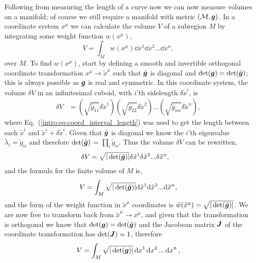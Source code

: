 Following from measuring the length of a curve now we can now measure volumes on a manifold; of course we still require a manifold with metric $(\mathcal{M},\boldsymbol{g})$. In a coordinate system $x^\mu$ we can calculate the volume $V$ of a subregion $M$ by integrating some weight function $w(x^\mu)$,
\begin{equation}
V = \int_{M} w(x^\mu) \dd x^1 \dd x^2 ... \dd x^n,
\end{equation}
over $M$. To find $w(x^\mu)$, start by defining a smooth and invertible orthogonal coordinate transformation $x^\mu \rightarrow \tilde{x}^\mu$ such that $\tilde{\boldsymbol{g}}$ is diagonal and $\det(\boldsymbol{g})=\det(\tilde{\boldsymbol{g}})$; this is always possible as $\boldsymbol{g}$ is real and symmetric. In this coordinate system, the volume $\delta V$ in an infinitesimal cuboid, with $i$'th sidelength $\delta \tilde{x}^i$, is
\begin{align}
\delta V &=  \left( \sqrt{\tilde{g}_{11}}\delta \tilde{x}^1 \right)\left(\sqrt{\tilde{g}_{22}}\delta \tilde{x}^2 \right)... \left(\sqrt{\tilde{g}_{nn}}\delta \tilde{x}^n\right) ,
\end{align}
where Eq.~(\ref{intro:eq:coord_interval_length}) was used to get the length between each $\tilde{x}^i$ and $\tilde{x}^i + \delta \tilde{x}^i$. Given that $\tilde{\boldsymbol{g}}$ is diagonal we know the $i$'th eigenvalue $\tilde{\lambda}_i = \tilde{g}_{ii}$ and therefore $\det(\tilde{\boldsymbol{g}})$ = $\prod_i \tilde{g}_{ii}$. Thus the volume $\delta V$ can be rewritten,
\begin{align}
\delta V &=  \sqrt{|\det(\tilde{\boldsymbol{g}})|}\delta \tilde{x}^1 \delta \tilde{x}^2  ... \delta \tilde{x}^n ,
\end{align}
and the formula for the finite volume of $M$ is,
\begin{equation} \label{intro:eq:volume_curved}
V = \int_{M} \sqrt{|\det(\tilde{\boldsymbol{g}})|} \dd \tilde{x}^1 \dd \tilde{x}^2 ... \dd \tilde{x}^n,
\end{equation}
and the form of the weight function in $\tilde{x}^\mu$ coordinates is $\tilde{w}(\tilde{x}^\mu)= \sqrt{|\det(\tilde{\boldsymbol{g}})|}$.
We are now free to transform back from $\tilde{x}^\mu\rightarrow x^\mu$, and given that the transformation is orthogonal we know that $\det(\boldsymbol{g})=\det(\tilde{\boldsymbol{g}})$ and the Jacobean matrix $\boldsymbol{J}$ of the coordinate transformation has $\det({\boldsymbol{J}})=1$, therefore
\begin{equation}\label{intro:eq:volume_curved2}
V = \int_{M} \sqrt{|\det({\boldsymbol{g}})|} \dd {x}^1 \dd {x}^2 ... \dd {x}^n,
\end{equation}
